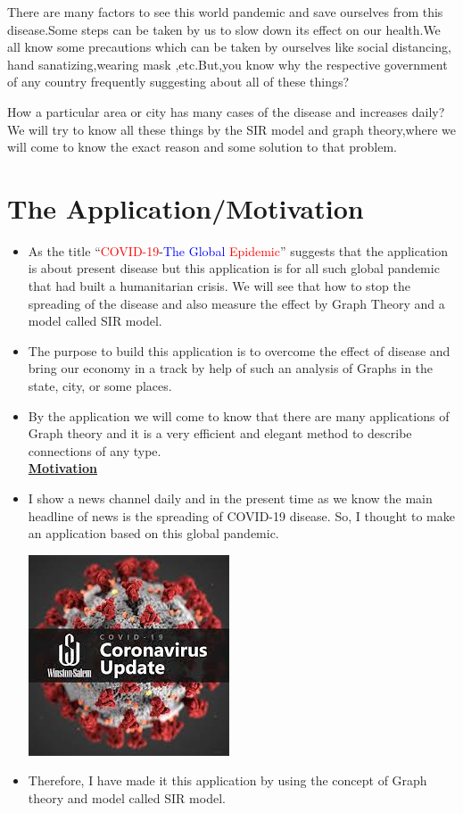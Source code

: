 \documentclass[12pt]{article}
\begin{document}
\par There are many factors to see this world pandemic and save ourselves from this disease.Some steps can be taken by us to slow down its effect on our health.We all know some precautions which can be taken by ourselves like social distancing, hand sanatizing,wearing mask ,etc.But,you know why the respective government of any country frequently suggesting about all of these things?\\
\par How a particular area or city  has many cases of the disease and increases daily?We will try to know all these things by the SIR model and graph theory,where  we will come to know the exact reason and some solution to that problem.
 

\newpage
\section{The Application/Motivation}\label{sec:intro}
\begin{itemize}
\item As the title “\textcolor{red}{COVID-19}-\textcolor{blue}{The Global} \textcolor{red}{Epidemic}” suggests that the application is about present disease but this application is for all such global pandemic that had built a humanitarian crisis. We will see that how to stop the spreading of the disease and also measure the effect by Graph Theory and a model called SIR model.
\item The purpose to build this application is to overcome the effect of disease and bring our economy in a track by help of such an analysis of Graphs in the state, city, or some places.
\item By the application we will come to know that there are many applications of Graph theory and it is a very efficient and elegant method to describe connections of any type.
\\
[1.5 cm]
\underline{\bf\huge{Motivation}}
\item  I show a news channel daily and in the present time as we know the main headline of news is the spreading of COVID-19 disease. So, I thought to make an application based on this global pandemic.
\begin{center}
\includegraphics{Images.jpg}
\end{center}
\item Therefore, I have made it this application by using the concept of Graph theory and model called SIR model.
\end{itemize}
\end{document}
